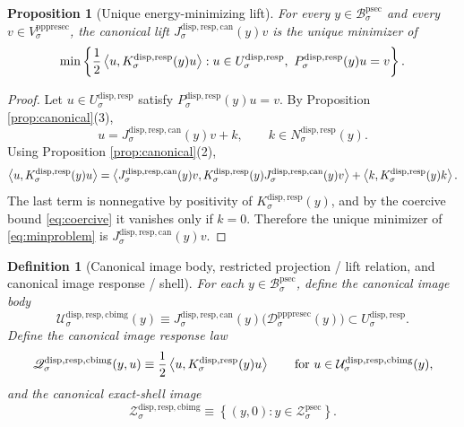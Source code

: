 \documentclass[11pt]{article}
\newcommand{\ProtoSectionBody}[1]{\mathcal B_{#1}^{\mathrm{psec}}}
\newcommand{\ProtoSectionShell}[1]{\mathcal Z_{#1}^{\mathrm{psec}}}
\newcommand{\PrePreProtoSectionVertical}[1]{V_{#1}^{\mathrm{pppresec}}}
\newcommand{\PrePreProtoSectionResidualBody}[1]{\mathcal D_{#1}^{\mathrm{pppresec}}}
\newcommand{\SubstrateCarrier}[1]{U_{#1}^{\mathrm{disp,resp}}}
\newcommand{\SubstrateProjection}[1]{P_{#1}^{\mathrm{disp,resp}}}
\newcommand{\SubstrateOperator}[1]{K_{#1}^{\mathrm{disp,resp}}}
\newcommand{\SubstrateKernel}[1]{N_{#1}^{\mathrm{disp,resp}}}
\newcommand{\CanonicalLift}[1]{J_{#1}^{\mathrm{disp,resp,can}}}
\newcommand{\CanonicalImageBody}[1]{\mathcal U_{#1}^{\mathrm{disp,resp,cbimg}}}
\newcommand{\CanonicalImageShell}[1]{\mathcal Z_{#1}^{\mathrm{disp,resp,cbimg}}}
\newcommand{\CanonicalImageResponseLaw}[1]{\mathscr Q_{#1}^{\mathrm{disp,resp,cbimg}}}
\newtheorem{definition}{Definition}
\newtheorem{proposition}{Proposition}
\begin{document}
\begin{proposition}[Unique energy-minimizing lift]
\label{prop:min}
For every \(y\in\ProtoSectionBody{\sigma}\) and every \(v\in\PrePreProtoSectionVertical{\sigma}\), the canonical lift \(\CanonicalLift{\sigma}(y)v\) is the unique minimizer of
\begin{equation}
\min\left\{
\frac{1}{2}\ev{u,\SubstrateOperator{\sigma}(y)u}:
u\in\SubstrateCarrier{\sigma},
\ \SubstrateProjection{\sigma}(y)u=v
\right\}.
\label{eq:minproblem}
\end{equation}
\end{proposition}

\begin{proof}
Let \(u\in\SubstrateCarrier{\sigma}\) satisfy \(\SubstrateProjection{\sigma}(y)u=v\). By Proposition \ref{prop:canonical}(3),
\[
u=\CanonicalLift{\sigma}(y)v+k,
\qquad
k\in\SubstrateKernel{\sigma}(y).
\]
Using Proposition \ref{prop:canonical}(2),
\[
\ev{u,\SubstrateOperator{\sigma}(y)u}
=
\ev{
\CanonicalLift{\sigma}(y)v,
\SubstrateOperator{\sigma}(y)\CanonicalLift{\sigma}(y)v
}
+
\ev{k,\SubstrateOperator{\sigma}(y)k}.
\]
The last term is nonnegative by positivity of \(\SubstrateOperator{\sigma}(y)\), and by the coercive bound \eqref{eq:coercive} it vanishes only if \(k=0\). Therefore the unique minimizer of \eqref{eq:minproblem} is \(\CanonicalLift{\sigma}(y)v\).
\end{proof}

\begin{definition}[Canonical image body, restricted projection / lift relation, and canonical image response / shell]
\label{def:image}
For each \(y\in\ProtoSectionBody{\sigma}\), define the \emph{canonical image body}
\begin{equation}
\CanonicalImageBody{\sigma}(y)
\equiv
\CanonicalLift{\sigma}(y)\bigl(\PrePreProtoSectionResidualBody{\sigma}(y)\bigr)
\subset
\SubstrateCarrier{\sigma}.
\label{eq:imagebody}
\end{equation}
Define the \emph{canonical image response law}
\begin{equation}
\CanonicalImageResponseLaw{\sigma}(y,u)
\equiv
\frac{1}{2}
\ev{u,\SubstrateOperator{\sigma}(y)u}
\qquad
\text{for }
u\in\CanonicalImageBody{\sigma}(y),
\label{eq:imageresponse}
\end{equation}
and the \emph{canonical exact-shell image}
\begin{equation}
\CanonicalImageShell{\sigma}
\equiv
\left\{
(y,0):y\in\ProtoSectionShell{\sigma}
\right\}.
\label{eq:imageshell}
\end{equation}
\end{definition}
\end{document}

